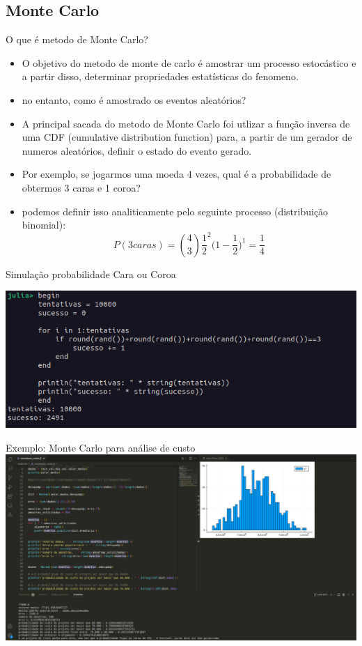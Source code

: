 \documentclass{beamer}
\begin{document}
		\subsection{Monte Carlo}
		\begin{frame}{O que é metodo de Monte Carlo?}
			\begin{itemize}[<+->]
				\item O objetivo do metodo de monte de carlo é amostrar um processo estocástico e a partir disso, determinar propriedades estatísticas do fenomeno.
				\item no entanto, como é amostrado os eventos aleatórios?
				\item A principal sacada do metodo de Monte Carlo foi utlizar a função inversa de uma CDF (cumulative distribution function) para, a partir de um gerador de numeros aleatórios, definir o estado do evento gerado.
				\item Por exemplo, se jogarmos uma moeda 4 vezes, qual é a probabilidade de obtermos 3 caras e 1 coroa?
				\item podemos definir isso analiticamente pelo seguinte processo (distribuição binomial):
				\begin{equation}
					P(3 caras) = \binom{4}{3}\frac{1}{2}^2\big(1-\frac{1}{2})^1 = \frac{1}{4}
				\end{equation}
			\end{itemize}
		\end{frame}
		\begin{frame}{Simulação probabilidade Cara ou Coroa}
		\begin{center}
			\includegraphics[width=\textwidth]{simul-monte-carlo}
		\end{center}
		\end{frame}
		\begin{frame}{Exemplo: Monte Carlo para análise de custo}
			\includegraphics[width=\textwidth]{montecarlo2}
		\end{frame}
\end{document}
